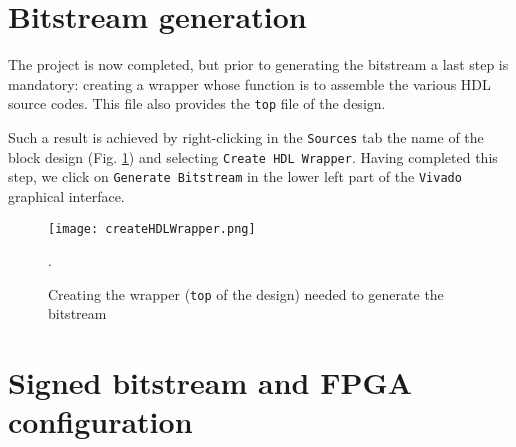 \documentclass[10pt,oneside]{article}
\begin{document}
%

\section{Bitstream generation}

The project is now completed, but prior to generating the bitstream a last step
is mandatory: creating a wrapper whose function is to assemble the various HDL source
codes. This file also provides the {\tt top} file of the design.

Such a result is achieved by right-clicking in the {\tt Sources} tab the name
of the block design (Fig. \ref{createHDLWrapper}) and selecting {\tt Create HDL Wrapper}.
Having completed this step, we click on {\tt Generate Bitstream} in the lower left part of the {\tt Vivado}
graphical interface.

\begin{figure}[h!tb]
\begin{center}
\texttt{[image: createHDLWrapper.png]}
\end{center}
\caption{Creating the wrapper ({\tt top} of the design) needed to generate the
bitstream}.
\label{createHDLWrapper}
\end{figure}

\section{Signed bitstream and FPGA configuration}
\end{document}
